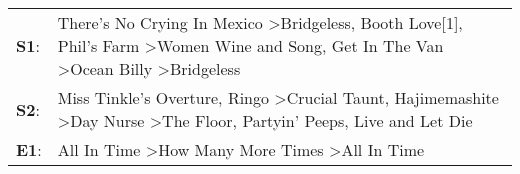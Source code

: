 \begin{supertabular}{p{0.03\textwidth}p{0.92\textwidth}}
 \textbf{S1}:  &  There's No Crying In Mexico\textsuperscript{} \textgreater \enspace Bridgeless\textsuperscript{}, \enspace Booth Love[1]\textsuperscript{}, \enspace Phil's Farm\textsuperscript{} \textgreater \enspace Women Wine and Song\textsuperscript{}, \enspace Get In The Van\textsuperscript{} \textgreater \enspace Ocean Billy\textsuperscript{} \textgreater \enspace Bridgeless\textsuperscript{}  \enspace  \\
 \textbf{S2}:  &                            Miss Tinkle's Overture\textsuperscript{}, \enspace Ringo\textsuperscript{} \textgreater \enspace Crucial Taunt\textsuperscript{}, \enspace Hajimemashite\textsuperscript{} \textgreater \enspace Day Nurse\textsuperscript{} \textgreater \enspace The Floor\textsuperscript{}, \enspace Partyin' Peeps\textsuperscript{}, \enspace Live and Let Die\textsuperscript{}  \enspace  \\
 \textbf{E1}:  &                                                                                                                                                                                                                                                     All In Time\textsuperscript{} \textgreater \enspace How Many More Times\textsuperscript{} \textgreater \enspace All In Time\textsuperscript{}  \enspace  \\
\end{supertabular}
